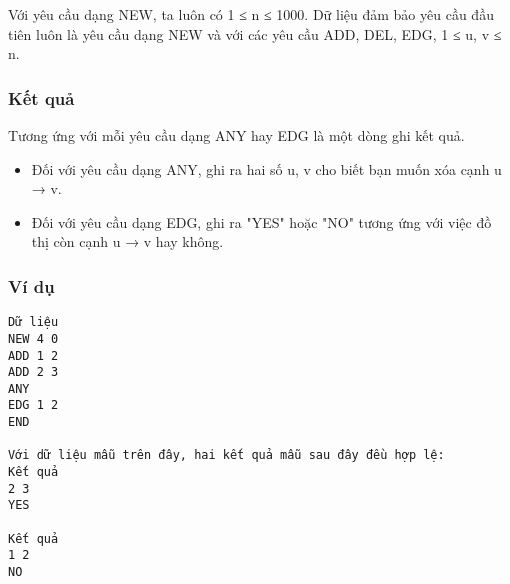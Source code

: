    Với yêu cầu dạng NEW, ta luôn có 1 ≤ n ≤ 1000. Dữ liệu đảm bảo yêu cầu đầu tiên luôn là yêu cầu dạng NEW và với các yêu cầu ADD, DEL, EDG, 1 ≤ u, v ≤ n.  

\subsubsection{   Kết quả  }

   Tương ứng với mỗi yêu cầu dạng ANY hay EDG là một dòng ghi kết quả.  
\begin{itemize}
	\item     Đối với yêu cầu dạng ANY, ghi ra hai số u, v cho biết bạn muốn xóa cạnh u → v.   
	\item     Đối với yêu cầu dạng EDG, ghi ra "YES" hoặc "NO" tương ứng với việc đồ thị còn cạnh u → v hay không.   
\end{itemize}

\subsubsection{   Ví dụ  }
\begin{verbatim}
Dữ liệu
NEW 4 0
ADD 1 2
ADD 2 3
ANY
EDG 1 2
END

Với dữ liệu mẫu trên đây, hai kết quả mẫu sau đây đều hợp lệ:
Kết quả
2 3
YES

Kết quả
1 2
NO
\end{verbatim}